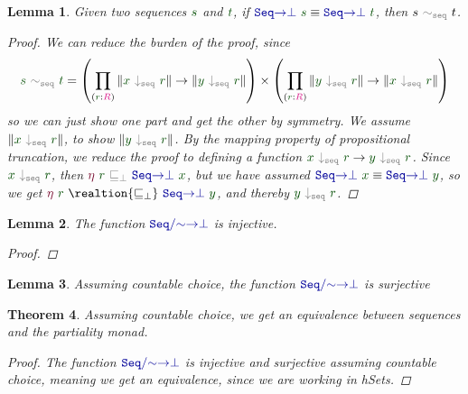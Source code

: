 \documentclass[twoside,11pt,openright]{report}
\theoremstyle{plain} %
\newtheorem{thm}{Theorem}[section]
\newtheorem{lem}[thm]{Lemma}
\theoremstyle{definition}
\theoremstyle{remark}
\newcommand*{\term}[1]{\textcolor{green!30!black}{#1}} %
\newcommand*{\type}[1]{\textcolor{magenta!90!black}{#1}}
\newcommand*{\relation}[1]{\textcolor{gray}{\ensuremath{\mathtt{#1}}}}
\newcommand*{\function}[1]{\textcolor{blue!60!black}{\ensuremath{\mathtt{#1}}}}
\newcommand*{\constructor}[1]{\textcolor{purple!60!black}{\ensuremath{\mathtt{#1}}}}
\begin{document}
\begin{lem}
  Given two sequences \(\term{s}\) and \(\term{t}\), if \(\function{Seq{\rightarrow}\bot}~\term{s} \equiv \function{Seq{\rightarrow}\bot}~\term{t}\), then \(s~\relation{\sim_{seq}}~t\).
  \begin{proof}
    We can reduce the burden of the proof, since
    \begin{equation}
      \term{s}~\relation{\sim_{seq}}~\term{t} = \left(\prod_{(\term{r} : \type{R})} \| \term{x}~\relation{\downarrow_{seq}}~\term{r} \| \rightarrow \| \term{y}~\relation{\downarrow_{seq}}~\term{r} \|\right) \times \left(\prod_{(\term{r} : \type{R})} \| \term{y}~\relation{\downarrow_{seq}}~\term{r} \| \rightarrow \| \term{x}~\relation{\downarrow_{seq}}~\term{r} \|\right)
    \end{equation}
    so we can just show one part and get the other by symmetry. We assume \(\| \term{x}~\relation{\downarrow_{seq}}~\term{r} \|\), to show \(\| \term{y}~\relation{\downarrow_{seq}}~\term{r} \|\). By the mapping property of propositional truncation, we reduce the proof to defining a function \(\term{x}~\relation{\downarrow_{seq}}~\term{r} \rightarrow \term{y}~\relation{\downarrow_{seq}}~\term{r}\). Since \(\term{x}~\relation{\downarrow_{seq}}~\term{r}\), then \(\constructor{\eta}~\term{r}~\relation{\sqsubseteq_{\bot}}~\function{Seq{\rightarrow}\bot}~\term{x}\), but we have assumed \(\function{Seq{\rightarrow}\bot}~\term{x} \equiv \function{Seq{\rightarrow}\bot}~\term{y}\), so we get \(\constructor{\eta}~\term{r}~\realtion{\sqsubseteq_{\bot}}~\function{Seq{\rightarrow}\bot}~\term{y}\), and thereby \(\term{y}~\relation{\downarrow_{seq}}~\term{r}\).
  \end{proof}
\end{lem}
\begin{lem}
  The function \(\function{Seq/{\sim}{\rightarrow}\bot}\) is injective.
  \begin{proof}
  \end{proof}
\end{lem}
\begin{lem}
  Assuming countable choice, the function \(\function{Seq/{\sim}{\rightarrow}\bot}\) is surjective
\end{lem}
\begin{thm}
  Assuming countable choice, we get an equivalence between sequences and the partiality monad.
  \begin{proof}
 The function \(\function{Seq/{\sim}{\rightarrow}\bot}\) is injective and surjective assuming countable choice, meaning we get an equivalence, since we are working in hSets.
\end{proof}
\end{thm}
\end{document}
